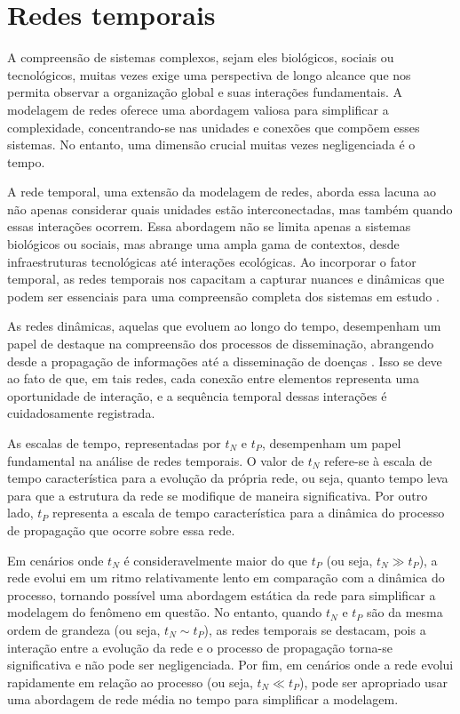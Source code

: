 \section{Redes temporais}

A compreensão de sistemas complexos, sejam eles biológicos, sociais ou tecnológicos, muitas vezes exige uma perspectiva de longo alcance que nos permita observar a organização global e suas interações fundamentais. A modelagem de redes oferece uma abordagem valiosa para simplificar a complexidade, concentrando-se nas unidades e conexões que compõem esses sistemas. No entanto, uma dimensão crucial muitas vezes negligenciada é o tempo. 

A rede temporal, uma extensão da modelagem de redes, aborda essa lacuna ao não apenas considerar quais unidades estão interconectadas, mas também quando essas interações ocorrem. Essa abordagem não se limita apenas a sistemas biológicos ou sociais, mas abrange uma ampla gama de contextos, desde infraestruturas tecnológicas até interações ecológicas. Ao incorporar o fator temporal, as redes temporais nos capacitam a capturar nuances e dinâmicas que podem ser essenciais para uma compreensão completa dos sistemas em estudo \cite{HOLME201297}.

As redes dinâmicas, aquelas que evoluem ao longo do tempo, desempenham um papel de destaque na compreensão dos processos de disseminação, abrangendo desde a propagação de informações até a disseminação de doenças \cite{HOLME201297}. Isso se deve ao fato de que, em tais redes, cada conexão entre elementos representa uma oportunidade de interação, e a sequência temporal dessas interações é cuidadosamente registrada.

As escalas de tempo, representadas por $t_N$ e $t_P$, desempenham um papel fundamental na análise de redes temporais. O valor de $t_N$ refere-se à escala de tempo característica para a evolução da própria rede, ou seja, quanto tempo leva para que a estrutura da rede se modifique de maneira significativa. Por outro lado, $t_P$ representa a escala de tempo característica para a dinâmica do processo de propagação que ocorre sobre essa rede.

Em cenários onde $t_N$ é consideravelmente maior do que $t_P$ (ou seja, $t_N \gg t_P$), a rede evolui em um ritmo relativamente lento em comparação com a dinâmica do processo, tornando possível uma abordagem estática da rede para simplificar a modelagem do fenômeno em questão. No entanto, quando $t_N$ e $t_P$ são da mesma ordem de grandeza (ou seja, $t_N \sim t_P$), as redes temporais se destacam, pois a interação entre a evolução da rede e o processo de propagação torna-se significativa e não pode ser negligenciada. Por fim, em cenários onde a rede evolui rapidamente em relação ao processo (ou seja, $t_N \ll t_P$), pode ser apropriado usar uma abordagem de rede média no tempo para simplificar a modelagem.

